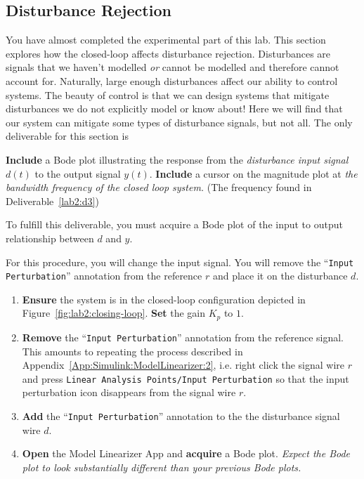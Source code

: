 %
%

\subsection{Disturbance Rejection}
You have almost completed the experimental part of this lab. This section
explores how the closed-loop affects disturbance rejection. Disturbances are
signals that we haven't modelled \emph{or} cannot be modelled and therefore
cannot account for. Naturally, large enough disturbances affect our ability to
control systems. The beauty of control is that we can design systems that
mitigate disturbances we do not explicitly model or know about! Here we will
find that our system can mitigate some types of disturbance signals, but not
all. The only deliverable for this section is
%
\begin{deliverable}[label={lab2:d4}]
  \textbf{Include} a Bode plot illustrating the response from the
  \emph{disturbance input signal} \(d(t)\) to the output signal \(y(t).\)
  \textbf{Include} a cursor on the magnitude plot at \emph{the bandwidth
  frequency of the closed loop system.} (The frequency found in
  Deliverable~\ref{lab2:d3})
\end{deliverable}
%
To fulfill this deliverable, you must acquire a Bode plot of the input to
output relationship between \(d\) and \(y.\)
%
\begin{procedure}[label={proc:lab2:p5}]
  For this procedure, you will change the input signal. You will remove the
  ``\texttt{Input Perturbation}'' annotation from the reference \(r\) and
  place it on the disturbance \(d.\)

  \begin{enumerate}[label=(\arabic*)]
    \item{
      \textbf{Ensure} the system is in the closed-loop configuration
      depicted in Figure~\ref{fig:lab2:closing-loop}.
      \textbf{Set} the gain \(K_p\) to \(1.\)
    }
    \item{
      \textbf{Remove} the ``\texttt{Input Perturbation}'' annotation from
      the reference signal. This amounts to repeating the process described
      in Appendix~\ref{App:Simulink:ModelLinearizer:2}, i.e. right click the
      signal wire \(r\) and press
      \texttt{Linear Analysis Points/Input Perturbation} so that the
      input perturbation icon disappears from the signal wire \(r.\)
    }
    \item{
      \textbf{Add} the ``\texttt{Input Perturbation}'' annotation to the
      the disturbance signal wire \(d.\)
    }
    \item{
      \textbf{Open} the Model Linearizer App and \textbf{acquire} a Bode
      plot. \emph{Expect the Bode plot to look substantially different than
      your previous Bode plots.}
    }
  \end{enumerate}
\end{procedure}


